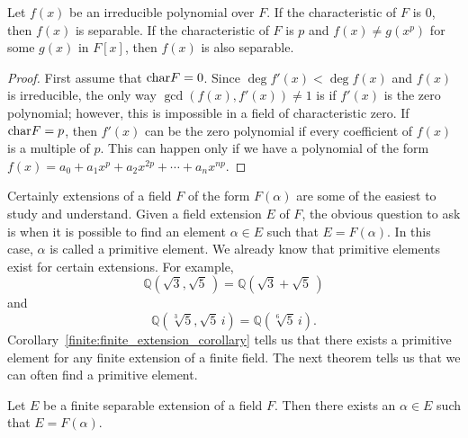 \begin{proposition}
Let $f(x)$ be an irreducible polynomial over $F$. If the
characteristic of $F$ is $0$, then $f(x)$ is separable.  If the
characteristic of $F$ is $p$ and $f(x) \neq g(x^p)$ for some $g(x)$
in $F[x]$, then $f(x)$ is also separable.
\end{proposition}
 
 
\begin{proof}
First assume that ${\rm char } F = 0$. Since $\deg f'(x) < \deg f(x)$ 
and $f(x)$ is irreducible, the only way $\gcd( f(x), f'(x)) \neq 1$ is
if $f'(x)$ is the zero polynomial; however, this is impossible in
a field of characteristic zero. If ${\rm char } F = p$, then $f'(x)$
can be the zero polynomial if every coefficient of $f(x)$ is a
multiple of $p$.  This can happen only if we have a polynomial of the
form $f(x) = a_0 + a_1 x^p + a_2 x^{2p} + \cdots + a_n x^{np}$. 
\end{proof}
 
 
\medskip
 
 
Certainly extensions of a field $F$ of the form $F(\alpha)$ are some
of the easiest to study and understand.  Given a field extension $E$
of $F$, the obvious question to ask is when it is possible to find an
element $\alpha \in E$ such that $E = F( \alpha )$. In this case,
$\alpha$ is called a {\bfi primitive
element}. We already
know that primitive elements exist for certain extensions. For example,
\[
{\mathbb Q}( \sqrt{3}, \sqrt{5}\, ) = {\mathbb Q}( \sqrt{3} + \sqrt{5}\, )
\]
and
\[
{\mathbb Q}( \sqrt[3]{5}, \sqrt{5}\, i ) = {\mathbb Q}( \sqrt[6]{5}\, i ).
\]
Corollary~\ref{finite:finite_extension_corollary} tells us that there exists a primitive element for any 
finite extension of a finite field. The next theorem tells us that we 
can often find a primitive element.
 
 
\begin{theorem} 
Let $E$ be a finite separable extension of a field $F$. Then there
exists an $\alpha \in E$ such that $E=F( \alpha )$. 
\end{theorem}
 
